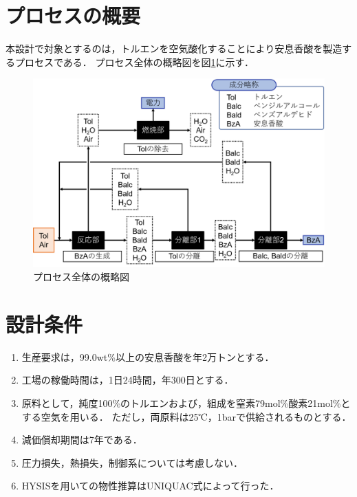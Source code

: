 \documentclass[a4j]{jsreport}
\begin{document}
\section{プロセスの概要}
本設計で対象とするのは，トルエンを空気酸化することにより安息香酸を製造するプロセスである．
プロセス全体の概略図を図\ref{プロセス全体のの概略図}に示す．
\begin{figure}[htbp]
    \begin{center}
        \includegraphics[scale=0.6]{processOutline.png}
        \caption{プロセス全体の概略図}
        \label{プロセス全体のの概略図}
    \end{center}
\end{figure}

\section{設計条件}
\begin{enumerate}
    \item 生産要求は，99.0wt\%以上の安息香酸を年2万トンとする．\\
    \item 工場の稼働時間は，1日24時間，年300日とする．\\
    \item 原料として，純度100\%のトルエンおよび，組成を窒素79mol\%酸素21mol\%とする空気を用いる．
             ただし，両原料は25℃，1barで供給されるものとする．\\
    \item 減価償却期間は7年である．\\
    \item 圧力損失，熱損失，制御系については考慮しない．\\
    \item HYSISを用いての物性推算はUNIQUAC式によって行った．
\end{enumerate}
\end{document}
